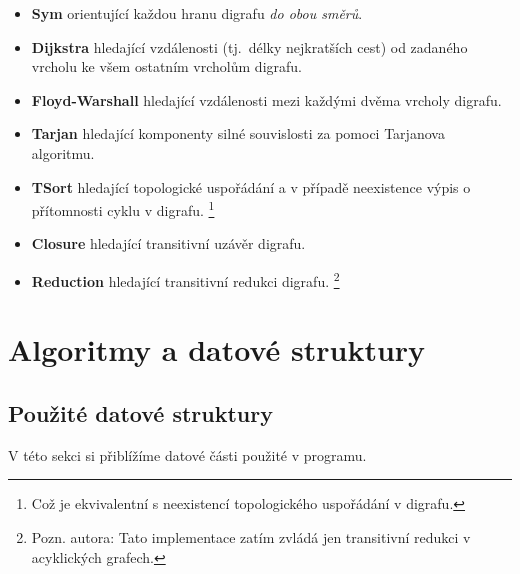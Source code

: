\documentclass[11pt,a4paper]{article}
\begin{document}
\begin{itemize}
\item \textbf{Sym} orientující každou hranu digrafu {\sl do obou směrů\/}.
\item \textbf{Dijkstra} hledající vzdálenosti (tj.\ délky nejkratších cest) od
zadaného vrcholu ke všem ostatním vrcholům digrafu.
\item \textbf{Floyd-Warshall} hledající vzdálenosti mezi každými dvěma vrcholy
digrafu.
\item \textbf{Tarjan} hledající komponenty silné souvislosti za pomoci
Tarjanova algoritmu.
\item \textbf{TSort} hledající topologické uspořádání a v případě neexistence
výpis o přítomnosti cyklu v digrafu.%
\footnote{Což je ekvivalentní s neexistencí topologického uspořádání v digrafu.}
\item \textbf{Closure} hledající transitivní uzávěr digrafu.
\item \textbf{Reduction} hledající transitivní redukci digrafu.%
\footnote{Pozn. autora: Tato implementace zatím zvládá jen transitivní redukci
  v acyklických grafech.}
\end{itemize}

\section{Algoritmy a datové struktury}
\subsection{Použité datové struktury}
V této sekci si přiblížíme datové části použité v programu.
\end{document}
